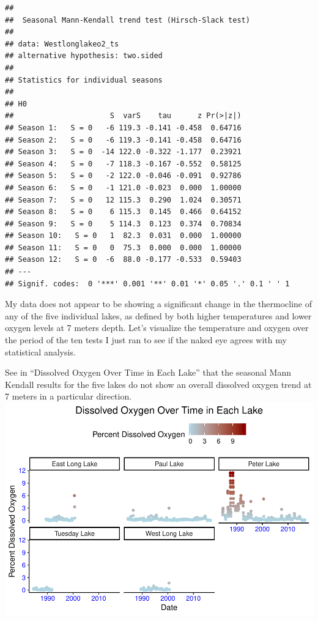 \documentclass[12pt,]{article}
\begin{document}
\begin{verbatim}
## 
##  Seasonal Mann-Kendall trend test (Hirsch-Slack test)
## 
## data: Westlonglakeo2_ts
## alternative hypothesis: two.sided
## 
## Statistics for individual seasons
## 
## H0
##                      S  varS    tau      z Pr(>|z|)  
## Season 1:   S = 0   -6 119.3 -0.141 -0.458  0.64716  
## Season 2:   S = 0   -6 119.3 -0.141 -0.458  0.64716  
## Season 3:   S = 0  -14 122.0 -0.322 -1.177  0.23921  
## Season 4:   S = 0   -7 118.3 -0.167 -0.552  0.58125  
## Season 5:   S = 0   -2 122.0 -0.046 -0.091  0.92786  
## Season 6:   S = 0   -1 121.0 -0.023  0.000  1.00000  
## Season 7:   S = 0   12 115.3  0.290  1.024  0.30571  
## Season 8:   S = 0    6 115.3  0.145  0.466  0.64152  
## Season 9:   S = 0    5 114.3  0.123  0.374  0.70834  
## Season 10:   S = 0   1  82.3  0.031  0.000  1.00000  
## Season 11:   S = 0   0  75.3  0.000  0.000  1.00000  
## Season 12:   S = 0  -6  88.0 -0.177 -0.533  0.59403  
## ---
## Signif. codes:  0 '***' 0.001 '**' 0.01 '*' 0.05 '.' 0.1 ' ' 1
\end{verbatim}

My data does not appear to be showing a significant change in the
thermocline of any of the five individual lakes, as defined by both
higher temperatures and lower oxygen levels at 7 meters depth. Let's
visualize the temperature and oxygen over the period of the ten tests I
just ran to see if the naked eye agrees with my statistical analysis.

See in ``Dissolved Oxygen Over Time in Each Lake'' that the seasonal
Mann Kendall results for the five lakes do not show an overall dissolved
oxygen trend at 7 meters in a particular direction.
\includegraphics{KeithBollt_ENV872_FinalProject_files/figure-latex/smk oxygen visualization-1.pdf}
\end{document}

